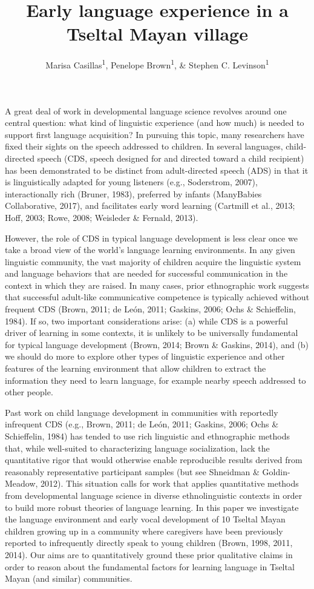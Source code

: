 \documentclass[floatsintext,man]{apa6}
\title{Early language experience in a Tseltal Mayan village}
\author{Marisa Casillas\textsuperscript{1}, Penelope Brown\textsuperscript{1}, \& Stephen C. Levinson\textsuperscript{1}}
\affiliation{
    \vspace{0.5cm}
          \textsuperscript{1} Max Planck Institute for Psycholinguistics  }
\theoremstyle{definition}
\theoremstyle{definition}
\theoremstyle{definition}
\theoremstyle{remark}
\begin{document}
\maketitle

\setcounter{secnumdepth}{0}



A great deal of work in developmental language science revolves around
one central question: what kind of linguistic experience (and how much)
is needed to support first language acquisition? In pursuing this topic,
many researchers have fixed their sights on the speech addressed to
children. In several languages, child-directed speech (CDS, speech
designed for and directed toward a child recipient) has been
demonstrated to be distinct from adult-directed speech (ADS) in that it
is linguistically adapted for young listeners (e.g., Soderstrom, 2007),
interactionally rich (Bruner, 1983), preferred by infants (ManyBabies
Collaborative, 2017), and facilitates early word learning (Cartmill et
al., 2013; Hoff, 2003; Rowe, 2008; Weisleder \& Fernald, 2013).

However, the role of CDS in typical language development is less clear
once we take a broad view of the world's language learning environments.
In any given linguistic community, the vast majority of children acquire
the linguistic system and language behaviors that are needed for
successful communication in the context in which they are raised. In
many cases, prior ethnographic work suggests that successful adult-like
communicative competence is typically achieved without frequent CDS
(Brown, 2011; de León, 2011; Gaskins, 2006; Ochs \& Schieffelin, 1984).
If so, two important considerations arise: (a) while CDS is a powerful
driver of learning in some contexts, it is unlikely to be universally
fundamental for typical language development (Brown, 2014; Brown \&
Gaskins, 2014), and (b) we should do more to explore other types of
linguistic experience and other features of the learning environment
that allow children to extract the information they need to learn
language, for example nearby speech addressed to other people.

Past work on child language development in communities with reportedly
infrequent CDS (e.g., Brown, 2011; de León, 2011; Gaskins, 2006; Ochs \&
Schieffelin, 1984) has tended to use rich linguistic and ethnographic
methods that, while well-suited to characterizing language
socialization, lack the quantitative rigor that would otherwise enable
reproducible results derived from reasonably representative participant
samples (but see Shneidman \& Goldin-Meadow, 2012). This situation calls
for work that applies quantitative methods from developmental language
science in diverse ethnolinguistic contexts in order to build more
robust theories of language learning. In this paper we investigate the
language environment and early vocal development of 10 Tseltal Mayan
children growing up in a community where caregivers have been previously
reported to infrequently directly speak to young children (Brown, 1998,
2011, 2014). Our aims are to quantitatively ground these prior
qualitative claims in order to reason about the fundamental factors for
learning language in Tseltal Mayan (and similar) communities.
\end{document}
